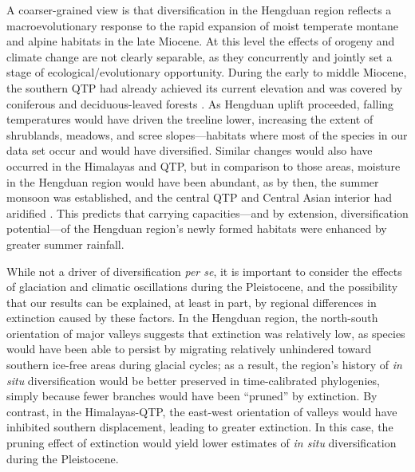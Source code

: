 A coarser-grained view is that diversification in the Hengduan region
reflects a macroevolutionary response to the rapid expansion of moist
temperate montane and alpine habitats in the late Miocene. At this
level the effects of orogeny and climate change are not clearly
separable, as they concurrently and jointly set a stage of
ecological/evolutionary opportunity. During the early to middle
Miocene, the southern QTP had already achieved its current elevation
\citep{Spicer2003} and was covered by coniferous and deciduous-leaved
forests
\citep{SunJ2014,LiH1976}%
. As Hengduan uplift proceeded, falling temperatures would have driven
the treeline lower, increasing the extent of shrublands, meadows, and
scree slopes---habitats where most of the species in our data set
occur and would have diversified. Similar changes would also have
occurred in the Himalayas and QTP, but in comparison to those areas,
moisture in the Hengduan region would have been abundant, as by then,
the summer monsoon was established, and the central QTP and Central
Asian interior had aridified \citep[see][]{Renner2016}. This predicts
that carrying capacities---and by extension, diversification
potential---of the Hengduan region's newly formed habitats were
enhanced by greater summer rainfall.


While not a driver of diversification \textit{per se}, it is important
to consider the effects of glaciation and climatic oscillations during
the Pleistocene, and the possibility that our results can be
explained, at least in part, by regional differences in extinction
caused by these factors. In the Hengduan region, the north-south
orientation of major valleys suggests that extinction was relatively
low, as species would have been able to persist by migrating
relatively unhindered toward southern ice-free areas during glacial
cycles; as a result, the region's history of \textit{in situ}
diversification would be better preserved in time-calibrated
phylogenies, simply because fewer branches would have been ``pruned''
by extinction. By contrast, in the Himalayas-QTP, the east-west
orientation of valleys would have inhibited southern displacement,
leading to greater extinction. In this case, the pruning effect of
extinction would yield lower estimates of \textit{in situ}
diversification during the Pleistocene.

